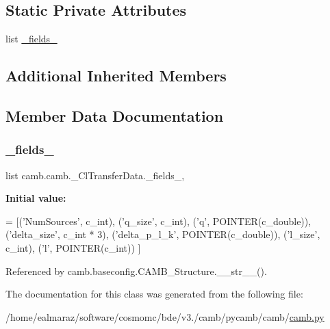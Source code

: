 \subsection*{Static Private Attributes}
\begin{DoxyCompactItemize}
\item 
list \mbox{\hyperlink{classcamb_1_1camb_1_1__ClTransferData_ad77d931f5ef330ce1262c5dfed91d840}{\+\_\+fields\+\_\+}}
\end{DoxyCompactItemize}
\subsection*{Additional Inherited Members}


\subsection{Member Data Documentation}
\mbox{\label{classcamb_1_1camb_1_1__ClTransferData_ad77d931f5ef330ce1262c5dfed91d840}} 
\subsubsection{\texorpdfstring{\+\_\+fields\+\_\+}{\_fields\_}}
{\footnotesize\ttfamily list camb.\+camb.\+\_\+\+Cl\+Transfer\+Data.\+\_\+fields\+\_\+\hspace{0.3cm}{\ttfamily [static]}, {\ttfamily [private]}}

{\bfseries Initial value\+:}
\begin{DoxyCode}
=  [(\textcolor{stringliteral}{'NumSources'}, c\_int),
                (\textcolor{stringliteral}{'q\_size'}, c\_int),
                (\textcolor{stringliteral}{'q'}, POINTER(c\_double)),
                (\textcolor{stringliteral}{'delta\_size'}, c\_int * 3),
                (\textcolor{stringliteral}{'delta\_p\_l\_k'}, POINTER(c\_double)),
                (\textcolor{stringliteral}{'l\_size'}, c\_int),
                (\textcolor{stringliteral}{'l'}, POINTER(c\_int))
                ]
\end{DoxyCode}


Referenced by camb.\+baseconfig.\+C\+A\+M\+B\+\_\+\+Structure.\+\_\+\+\_\+str\+\_\+\+\_\+().



The documentation for this class was generated from the following file\+:\begin{DoxyCompactItemize}
\item 
/home/ealmaraz/software/cosmomc/bde/v3./camb/pycamb/camb/\mbox{\hyperlink{camb_8py}{camb.\+py}}\end{DoxyCompactItemize}
